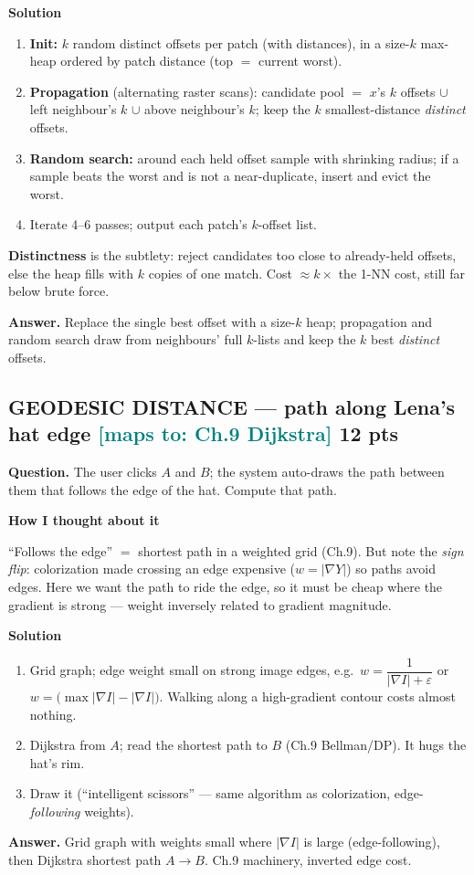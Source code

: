 \documentclass[11pt]{article}
\newcommand{\step}[1]{\smallskip\par\noindent\textbf{\textcolor{amber}{#1}}\par\nobreak}
\newcommand{\maps}[1]{{\small\textcolor{teal}{[maps to: #1]}}}
\newcommand{\ans}[1]{\begin{answer}\textbf{Answer.} #1\end{answer}}
\begin{document}
\step{Solution}
\begin{enumerate}
  \item \textbf{Init:} $k$ random distinct offsets per patch (with distances), in a size-$k$ max-heap ordered by
  patch distance (top $=$ current worst).
  \item \textbf{Propagation} (alternating raster scans): candidate pool $=$ $x$'s $k$ offsets $\cup$ left
  neighbour's $k$ $\cup$ above neighbour's $k$; keep the $k$ smallest-distance \emph{distinct} offsets.
  \item \textbf{Random search:} around each held offset sample with shrinking radius; if a sample beats the worst
  and is not a near-duplicate, insert and evict the worst.
  \item Iterate 4--6 passes; output each patch's $k$-offset list.
\end{enumerate}
\textbf{Distinctness} is the subtlety: reject candidates too close to already-held offsets, else the heap fills
with $k$ copies of one match. Cost $\approx k\times$ the 1-NN cost, still far below brute force.
\ans{Replace the single best offset with a size-$k$ heap; propagation and random search draw from neighbours' full
$k$-lists and keep the $k$ best \emph{distinct} offsets.}

\subsection{GEODESIC DISTANCE --- path along Lena's hat edge \hfill \maps{Ch.9 Dijkstra} \hfill \textnormal{\small 12 pts}}
\begin{qbox}\textbf{Question.} The user clicks $A$ and $B$; the system auto-draws the path between them that
follows the edge of the hat. Compute that path.\end{qbox}

\step{How I thought about it}
``Follows the edge'' $=$ shortest path in a weighted grid (Ch.9). But note the \emph{sign flip}: colorization made
crossing an edge expensive ($w=|\nabla Y|$) so paths avoid edges. Here we want the path to ride the edge, so it
must be cheap where the gradient is strong --- weight inversely related to gradient magnitude.

\step{Solution}
\begin{enumerate}
  \item Grid graph; edge weight small on strong image edges, e.g.\ $w=\dfrac{1}{|\nabla I|+\varepsilon}$ or
  $w=\big(\max|\nabla I|-|\nabla I|\big)$. Walking along a high-gradient contour costs almost nothing.
  \item Dijkstra from $A$; read the shortest path to $B$ (Ch.9 Bellman/DP). It hugs the hat's rim.
  \item Draw it (``intelligent scissors'' --- same algorithm as colorization, edge-\emph{following} weights).
\end{enumerate}
\ans{Grid graph with weights small where $|\nabla I|$ is large (edge-following), then Dijkstra shortest path
$A\!\to\!B$. Ch.9 machinery, inverted edge cost.}
\end{document}
